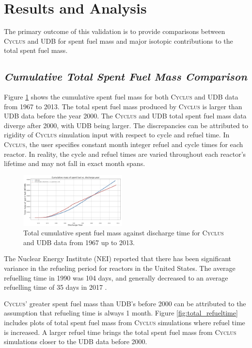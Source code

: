 \documentclass{anstrans}
\newcommand{\Cyclus}{\textsc{Cyclus}\xspace}%
\begin{document}
\section{Results and Analysis}
The primary outcome of this validation is to provide comparisons between \Cyclus and UDB for spent fuel mass and major isotopic contributions to the total spent fuel mass. 

\subsection{\textit{Cumulative Total Spent Fuel Mass Comparison}}
Figure \ref{fig:total_original} shows the cumulative spent fuel mass for both \Cyclus and UDB data from 1967 to 2013. The total spent fuel mass produced by \Cyclus is larger than UDB data before the year 2000. The \Cyclus and UDB total spent fuel mass data diverge after 2000, with UDB being larger. The discrepancies can be attributed to rigidity of \Cyclus simulation input with respect to cycle and refuel time. In \Cyclus, the user specifies constant month integer refuel and cycle times for each reactor. In reality, the cycle and refuel times are varied throughout each reactor's lifetime and may not fall in exact month spans. 

\begin{figure}[h] %
	\centering
	\includegraphics[width=0.48\textwidth]{total_cumulative_mass_spent_fuel_original}
	\caption{Total cumulative spent fuel mass against discharge time for \Cyclus and UDB data from 1967 up to 2013.}
	\label{fig:total_original}
\end{figure}

The Nuclear Energy Institute (NEI) reported that there has been significant variance in the refueling period for reactors in the United States. The average refuelling time in 1990 was 104 days, and generally decreased to an average refuelling time of 35 days in 2017 \cite{iaea_current_nodate}.

\Cyclus' greater spent fuel mass than UDB's before 2000 can be attributed to the assumption that refueling time is always 1 month. Figure \ref{fig:total_refueltime} includes plots of total spent fuel mass from \Cyclus simulations where refuel time is increased. A larger refuel time brings the total spent fuel mass from \Cyclus simulations closer to the UDB data before 2000. 
\end{document}
